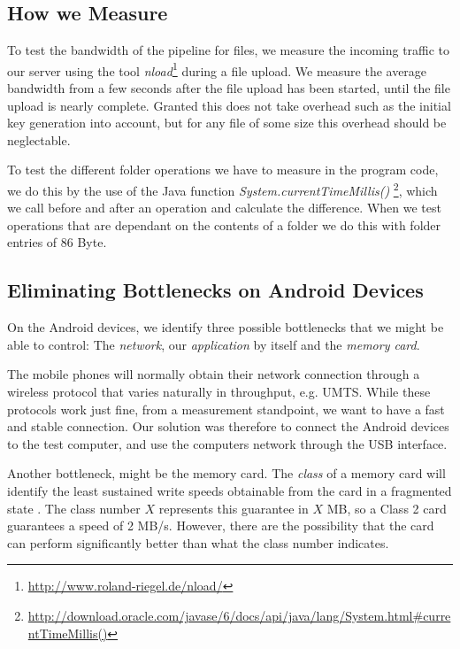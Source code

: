 \documentclass[pdftex,english,10pt,b5paper,twoside]{book}
\begin{document}
\subsection{How we Measure}

To test the bandwidth of the pipeline for files, we measure the incoming
traffic to our server using the tool \emph{nload}\footnote{
\url{http://www.roland-riegel.de/nload/}} during a file upload.  We measure the
average bandwidth from a few seconds after the file upload has been started,
until the file upload is nearly complete. Granted this does not take overhead
such as the initial key generation into account, but for any file of some size
this overhead should be neglectable.


To test the different folder operations we have to measure in the program code,
we do this by the use of the Java function
\emph{System.currentTimeMillis()}
\footnote{\url{http://download.oracle.com/javase/6/docs/api/java/lang/System.html\#currentTimeMillis()}},
which we call before and after an operation and calculate the difference. When
we test operations that are dependant on the contents of a folder we do this
with folder entries of 86 Byte.

\subsection{Eliminating Bottlenecks on Android Devices}

On the Android devices, we identify three possible bottlenecks that we might be
able to control: The \emph{network}, our \emph{application} by itself and the
\emph{memory card}.

The mobile phones will normally obtain their network connection through a
wireless protocol that varies naturally in throughput, e.g. \ac{UMTS}. While
these protocols work just fine, from a measurement standpoint, we want to have
a fast and stable connection. Our solution was therefore to connect the Android
devices to the test computer, and use the computers network through the
\ac{USB} interface.

Another bottleneck, might be the memory card. The \emph{class} of a memory card
will identify the least sustained write speeds obtainable from the card in a
fragmented state \cite{sdcard}. The class number $X$ represents this guarantee
in $X$ MB, so a Class 2 card guarantees a speed of 2 MB/s. However, there are
the possibility that the card can perform significantly better than what the
class number indicates.
\end{document}

